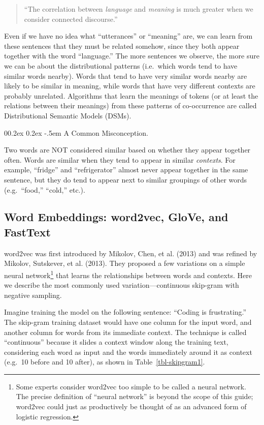 \documentclass[
  man,
  floatsintext,
  longtable,
  nolmodern,
  notxfonts,
  notimes,
  colorlinks=true,linkcolor=blue,citecolor=blue,urlcolor=blue]{apa7}
\makeatletter
\renewcommand{\paragraph}{\@startsection{paragraph}{4}{\parindent}%
	{0\baselineskip \@plus 0.2ex \@minus 0.2ex}%
	{-.5em}%
	{\normalfont\normalsize\bfseries\typesectitle}}
\makeatother
\begin{document}
\begin{quote}
``The correlation between \emph{language} and \emph{meaning} is much
greater when we consider connected discourse.''
\end{quote}

Even if we have no idea what ``utterances'' or ``meaning'' are, we can
learn from these sentences that they must be related somehow, since they
both appear together with the word ``language.'' The more sentences we
observe, the more sure we can be about the distributional patterns
(i.e.~which words tend to have similar words nearby). Words that tend to
have very similar words nearby are likely to be similar in meaning,
while words that have very different contexts are probably unrelated.
Algorithms that learn the meanings of tokens (or at least the relations
between their meanings) from these patterns of co-occurrence are called
Distributional Semantic Models (DSMs).

\paragraph{A Common Misconception.}\label{a-common-misconception}

Two words are NOT considered similar based on whether they appear
together often. Words are similar when they tend to appear in similar
\emph{contexts}. For example, ``fridge'' and ``refrigerator'' almost
never appear together in the same sentence, but they do tend to appear
next to similar groupings of other words (e.g.~``food,'' ``cold,''
etc.).

\subsection{Word Embeddings: word2vec, GloVe, and
FastText}\label{word-embeddings-word2vec-glove-and-fasttext}

word2vec was first introduced by Mikolov, Chen, et al. (2013) and was
refined by Mikolov, Sutskever, et al. (2013). They proposed a few
variations on a simple neural network\footnote{Some experts consider
  word2vec too simple to be called a neural network. The precise
  definition of ``neural network'' is beyond the scope of this guide;
  word2vec could just as productively be thought of as an advanced form
  of logistic regression.} that learns the relationships between words
and contexts. Here we describe the most commonly used
variation---continuous skip-gram with negative sampling.

Imagine training the model on the following sentence: ``Coding is
frustrating.'' The skip-gram training dataset would have one column for
the input word, and another column for words from its immediate context.
The technique is called ``continuous'' because it slides a context
window along the training text, considering each word as input and the
words immediately around it as context (e.g.~10 before and 10 after), as
shown in Table~\ref{tbl-skipgram1}.
\end{document}
